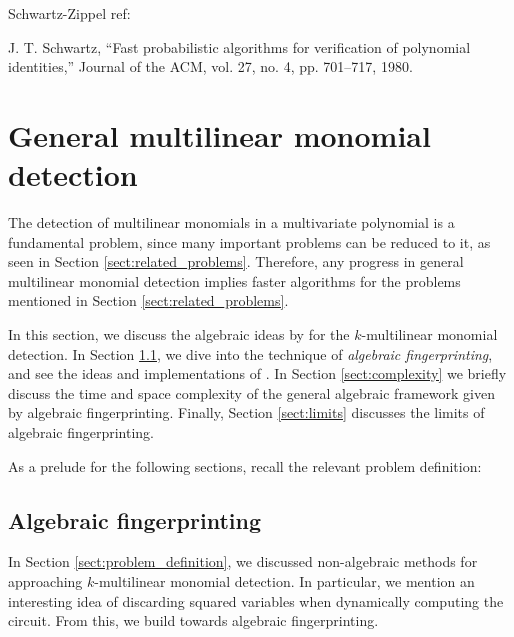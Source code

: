 Schwartz-Zippel ref:

J. T. Schwartz, “Fast probabilistic algorithms for verification of
polynomial identities,” Journal of the ACM, vol. 27, no. 4, pp. 701–717,
1980.



\clearpage
\section{General multilinear monomial detection}
\label{sect:general_mld}

The detection of multilinear monomials in a multivariate polynomial is a fundamental problem, 
since many important problems can be reduced to it, 
as seen in Section \ref{sect:related_problems}. 
Therefore, any progress in general multilinear monomial detection implies 
faster algorithms for the problems mentioned in Section \ref{sect:related_problems}.

In this section, 
we discuss the algebraic ideas by \citeauthor{KouWil09} \cite{Koutis08, Williams09, KouWil09} 
for the $k$-multilinear monomial detection. 
In Section \ref{sect:algebraic_fingerprinting}, 
we dive into the technique of \emph{algebraic fingerprinting}, and 
see the ideas and implementations of \citeauthor{KouWil09}. 
In Section \ref{sect:complexity} we briefly discuss the time and space complexity 
of the general algebraic framework given by algebraic fingerprinting. 
Finally, Section \ref{sect:limits} discusses the limits of algebraic fingerprinting.

As a prelude for the following sections, recall the relevant problem definition: 
\begin{problem}
\end{problem}

\subsection{Algebraic fingerprinting}
\label{sect:algebraic_fingerprinting}

In Section \ref{sect:problem_definition}, we discussed non-algebraic methods 
for approaching $k$-multilinear monomial detection. In particular, we mention
an interesting idea of discarding squared variables when dynamically 
computing the circuit. From this, we build towards algebraic fingerprinting. 

